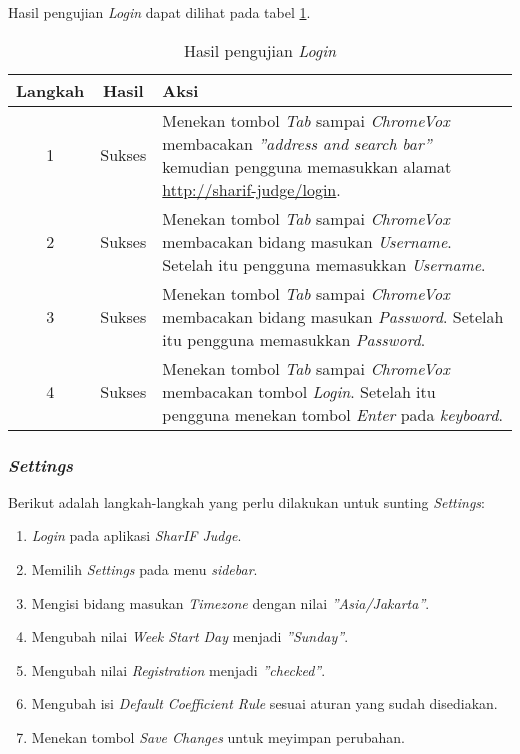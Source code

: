 Hasil pengujian \textit{Login} dapat dilihat pada tabel \ref{tab:hasil_login}.

\begin{table}[H]
	\centering
	\caption{Hasil pengujian \textit{Login}}
	\label{tab:hasil_login}
	\begin{tabular}{|c|c|p{12cm}|}
		\toprule
		Langkah & Hasil & Aksi\\
		\midrule
		1 & Sukses & Menekan tombol \textit{Tab} sampai \textit{ChromeVox} membacakan \textit{''address and search bar''} kemudian pengguna memasukkan alamat \url{http://sharif-judge/login}.\\
		2 & Sukses & Menekan tombol \textit{Tab} sampai \textit{ChromeVox} membacakan bidang masukan \textit{Username}. Setelah itu pengguna memasukkan \textit{Username}.\\
		3 & Sukses & Menekan tombol \textit{Tab} sampai \textit{ChromeVox} membacakan bidang masukan \textit{Password}. Setelah itu pengguna memasukkan \textit{Password}. \\
		4 & Sukses & Menekan tombol \textit{Tab} sampai \textit{ChromeVox} membacakan tombol \textit{Login}. Setelah itu pengguna menekan tombol \textit{Enter} pada \textit{keyboard}.\\
		\bottomrule
	\end{tabular}
\end{table}

\subsubsection{\textit{Settings}}
\label{subsubsec:skenario_settings}
Berikut adalah langkah-langkah yang perlu dilakukan untuk sunting \textit{Settings}:

\begin{enumerate}
	\item \textit{Login} pada aplikasi \textit{SharIF Judge}.
	\item Memilih \textit{Settings} pada menu \textit{sidebar}.
	\item Mengisi bidang masukan \textit{Timezone} dengan nilai \textit{''Asia/Jakarta''}.
	\item Mengubah nilai \textit{Week Start Day} menjadi \textit{''Sunday''}.
	\item Mengubah nilai \textit{Registration} menjadi \textit{''checked''}.
	\item Mengubah isi \textit{Default Coefficient Rule} sesuai aturan yang sudah disediakan.
	\item Menekan tombol \textit{Save Changes} untuk meyimpan perubahan.
\end{enumerate}

